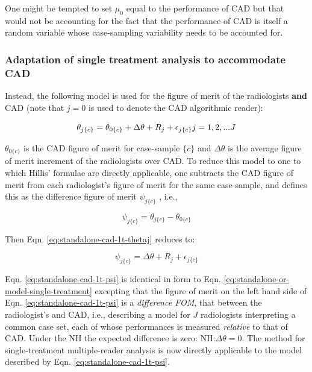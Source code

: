 \documentclass[
]{book}
\begin{document}
One might be tempted to set \(\mu_0\) equal to the performance of CAD but that would not be accounting for the fact that the performance of CAD is itself a random variable whose case-sampling variability needs to be accounted for.

\hypertarget{adaptation-of-single-treatment-analysis-to-accommodate-cad}{%
\subsubsection{Adaptation of single treatment analysis to accommodate CAD}\label{adaptation-of-single-treatment-analysis-to-accommodate-cad}}

Instead, the following model is used for the figure of merit of the radiologists \textbf{and} CAD (note that \(j = 0\) is used to denote the CAD algorithmic reader):

\begin{equation}
\theta_{j\{c\}} = \theta_{0\{c\}} + \Delta \theta + R_j + \epsilon_{j\{c\}}\\
j=1,2,...J
\label{eq:standalone-cad-1t-thetaj}
\end{equation}

\(\theta_{0\{c\}}\) is the CAD figure of merit for case-sample \(\{c\}\) and \(\Delta \theta\) is the average figure of merit increment of the radiologists over CAD. To reduce this model to one to which Hillis' formulae are directly applicable, one subtracts the CAD figure of merit from each radiologist's figure of merit for the same case-sample, and defines this as the difference figure of merit \(\psi_{j\{c\}}\) , i.e.,

\begin{equation}
\psi_{j\{c\}} = \theta_{j\{c\}} - \theta_{0\{c\}}
\label{eq:standalone-cad-diff-reader-def}
\end{equation}

Then Eqn. \eqref{eq:standalone-cad-1t-thetaj} reduces to:

\begin{equation}
\psi_{j\{c\}} = \Delta \theta + R_j + \epsilon_{j\{c\}}
\label{eq:standalone-cad-1t-psi}
\end{equation}

Eqn. \eqref{eq:standalone-cad-1t-psi} is identical in form to Eqn. \eqref{eq:standalone-or-model-single-treatment} excepting that the figure of merit on the left hand side of Eqn. \eqref{eq:standalone-cad-1t-psi} is a \emph{difference FOM}, that between the radiologist's and CAD, i.e., describing a model for \(J\) radiologists interpreting a common case set, each of whose performances is measured \emph{relative} to that of CAD. Under the NH the expected difference is zero: \(\text{NH:} \Delta \theta = 0\). The method \citep{hillis2005comparison, hillis2007comparison} for single-treatment multiple-reader analysis is now directly applicable to the model described by Eqn. \eqref{eq:standalone-cad-1t-psi}.
\end{document}
